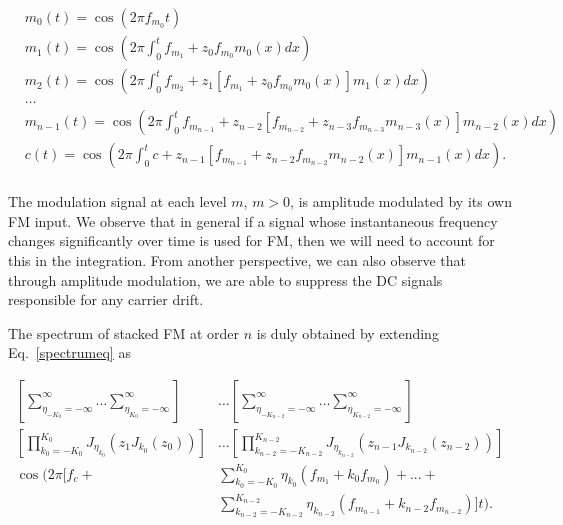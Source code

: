 \documentclass[]{interact}
\begin{document}
\begin{equation}\label{eq:high-order}
\begin{split}
&m_0(t) =  \cos(2\pi f_{m_0} t)\\
&m_1(t) = \cos\left(  2\pi\int_{0}^{t} f_{m_1} + z_0  f_{m_0} m_0(x)dx\right) \\
&m_2(t) =  \cos\left(2\pi \int_{0}^{t} f_{m_2} + z_1 [f_{m_1} + z_0 f_{m_0} m_0(x)] m_1(x) dx \right) \\
&\ldots \\
&m_{n-1}(t) =  \cos\left(2\pi \int_{0}^{t} f_{m_{n-1}} + z_{n-2} [f_{m_{n-2}} + z_{n-3} f_{m_{n-3}} m_{n-3}(x)] m_{n-2}(x) dx \right) \\
&c(t) =  \cos\left(2\pi \int_{0}^{t} c + z_{n-1} [f_{m_{n-1}} + z_{n-2}f_{m_{n-2}} m_{n-2}(x)] m_{n-1}(x) dx \right). \\
\end{split}
\end{equation}

The modulation signal at each level $m$, $m > 0$, is amplitude modulated by its own FM input. 
We observe that in general if a signal whose instantaneous frequency changes significantly 
over time is used for FM, then we will need to account for this in the integration. 
From another perspective, we can also observe that through amplitude modulation, we are able to suppress 
the DC signals responsible for any carrier drift. 

The spectrum of stacked FM at order $n$ is duly obtained by extending Eq.~\ref{spectrumeq} as

\begin{equation}\label{eq:high-order-spec}
\begin{split}
\left[\sum_{\eta_{-K_0}=-\infty}^{\infty} \ldots \sum_{\eta_{K_0}=-\infty}^{\infty}\right] &\ldots \left[\sum_{\eta_{-K_{n-2}}=-\infty}^{\infty} \ldots \sum_{\eta_{K_{n-2}}=-\infty}^{\infty}\right]\\
\left[\prod_{k_0=-K_0}^{K_0} J_{\eta_{k_0}}\left(z_1 J_{k_0}(z_0)\right)\right] &\ldots 
\left[\prod_{k_{n-2}=-K_{n-2}}^{K_{n-2}} J_{\eta_{k_{n-2}}}\left(z_{n-1} J_{k_{n-2}}(z_{n-2})\right)\right]  \\
\cos\Bigg(2 \pi \bigg[f_c  + &\sum_{k_0=-K_0}^{K_0} \eta_{k_0}(f_{m_1} + k_0 f_{m_0}) + ... + \\
& \sum_{k_{n-2}=-K_{n-2}}^{K_{n-2}} \eta_{k_{n-2}}(f_{m_{n-1}} + k_{n-2} f_{m_{n-2}})\bigg] t \Bigg).
\end{split}
\end{equation}
\end{document}
